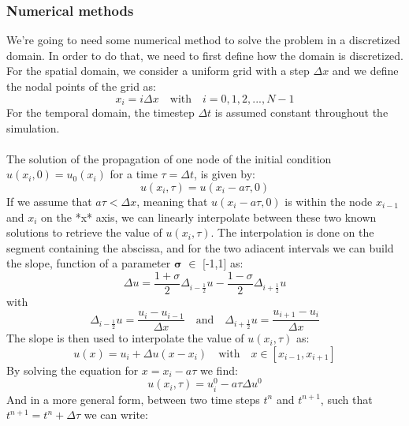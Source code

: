 \documentclass{report}
\begin{document}
\subsubsection*{Numerical methods}
We're going to need some numerical method to solve the problem in a discretized domain. In order to do that, we need to first define how the domain is discretized.
For the spatial domain, we consider a uniform grid with a step $\Delta x$ and we define the nodal points of the grid as:
\begin{equation*}
    x_i = i\Delta x \quad \textrm{with} \quad i = 0, 1, 2, ..., N-1
\end{equation*}
For the temporal domain, the timestep $\Delta t$ is assumed constant throughout the simulation.\\\\
The solution of the propagation of one node of the initial condition $u(x_i, 0) = u_0(x_i)$ for a time $\tau = \Delta t$, is given by:
\begin{equation*}
    u(x_i, \tau) = u(x_i - a\tau, 0)
\end{equation*}
If we assume that $a\tau < \Delta x$, meaning that $u(x_i - a\tau, 0)$ is within the node $x_{i-1}$ and $x_{i}$ on the *x* axis, we can linearly interpolate between these two known solutions to retrieve
the value of $u(x_i, \tau)$.
The interpolation is done on the segment containing the abscissa, and for the two adiacent intervals we can build the slope, function of a parameter $\mathbf{\sigma}$ $\in$ [-1,1] as:
\begin{equation*}
    \Delta u = \frac{1+\sigma}{2}\Delta_{i-\frac{1}{2}} u - \frac{1-\sigma}{2}\Delta_{i+\frac{1}{2}} u
\end{equation*}
with
\begin{equation*}
    \Delta_{i-\frac{1}{2}} u = \frac{u_{i} - u_{i-1}}{\Delta x} \quad \textrm{and} \quad \Delta_{i+\frac{1}{2}} u = \frac{u_{i+1} - u_{i}} {\Delta x}
\end{equation*}
The slope is then used to interpolate the value of $u(x_i, \tau)$ as:
\begin{equation*}
    u(x) = u_i + \Delta u(x - x_i) \quad \textrm{with} \quad x \in [x_{i-1}, x_{i+1}]
\end{equation*}
By solving the equation for $x = x_i -a\tau$ we find:
\begin{equation*}
    u(x_i, \tau) = u^0_i - a\tau \Delta u^0
\end{equation*}
And in a more general form, between two time steps $t^n$ and $t^{n+1}$, such that  $t^{n+1} = t^n + \Delta \tau$ we can write:
\end{document}
